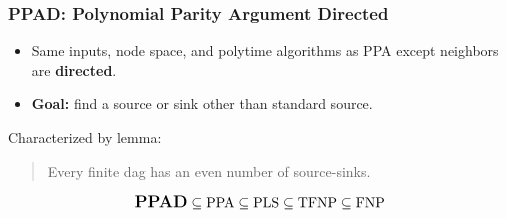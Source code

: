 \documentclass[10pt]{beamer}
\begin{document}
\begin{frame}
\frametitle{PPAD: Polynomial Parity Argument Directed}

\begin{itemize}
\item Same inputs, node space, and polytime algorithms as PPA except
      neighbors are \textbf{directed}.
\item \textbf{Goal:} find a source or sink other than standard source.
\end{itemize}

Characterized by lemma:

\begin{quote}
Every finite dag has an even number of source-sinks.
\end{quote}

\begin{displaymath}
\textrm{\large{\textbf{PPAD}}} \subseteq \textrm{PPA} \subseteq \textrm{PLS} \subseteq
\textrm{TFNP} \subseteq \textrm{FNP}
\end{displaymath}

\end{frame}
\end{document}
